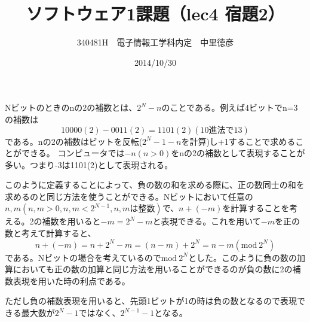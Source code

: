 \documentclass{jsarticle}
\title{ソフトウェア1課題（lec4 宿題2）}
\author{340481H　電子情報工学科内定　中里徳彦}
\date{2014/10/30}
\begin{document}
\maketitle
Nビットのときのnの2の補数とは、$2^N - n$のことである。例えば4ビットでn=3の補数は
\[
10000(2) - 0011(2) = 1101(2) (10進法で13)
\]
である。nの2の補数はビットを反転($2^{N}-1-n$を計算)し+1することで求めることができる。
コンピュータでは$-n(n>0)$をnの2の補数として表現することが多い。つまり-3は1101(2)として表現される。

このように定義することによって、負の数の和を求める際に、正の数同士の和を求めるのと同じ方法を使うことができる。Nビットにおいて任意の$n,m(n,m > 0, n,m < 2^{N-1}, n,mは整数)$で、$n+(-m)$を計算することを考える。2の補数を用いると$-m = 2^N - m$と表現できる。これを用いて$-m$を正の数と考えて計算すると、
\[
n+(-m) = n + 2^N -m = (n-m) + 2^N = n-m (\mathrm{mod}\:2^N)
\]
である。Nビットの場合を考えているので$\mathrm{mod}\:2^N$とした。このように負の数の加算においても正の数の加算と同じ方法を用いることができるのが負の数に2の補数表現を用いた時の利点である。

ただし負の補数表現を用いると、先頭1ビットが1の時は負の数となるので表現できる最大数が$2^{N}-1$ではなく、$2^{N-1}-1$となる。
\end{document}
